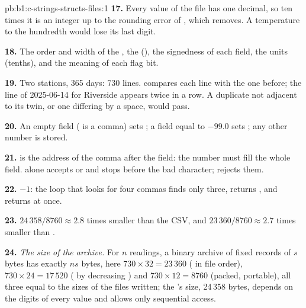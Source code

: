 \begin{solution}{pb:b1:c-strings-structs-files:1}
\textbf{17.} Every value of the file has one decimal, so ten times it is an integer up to the rounding error of
, which  removes. A temperature to the hundredth would lose its last digit.

\textbf{18.} The order and width of the , the  (), the signedness of each field, the
units (tenths), and the meaning of each flag bit.

\textbf{19.} Two stations, 365 days: 730 lines.  compares each line with the one before; the line
of 2025-06-14 for Riverside appears twice in a row. A duplicate not adjacent to its twin, or one differing by a space,
would pass.

\textbf{20.} An empty field ( is a comma) sets ; a field equal to $-99.0$ sets
; any other number is stored.

\textbf{21.}  is the address of the comma after the field: the number must fill the whole field.
 alone accepts  or  and stops before the bad character;  rejects
them.

\textbf{22.} $-1$: the loop that looks for four commas finds only three,  returns , and
 returns at once.

\textbf{23.} $24\,358 / 8760 \approx 2.8$ times smaller than the CSV, and $23\,360 / 8760 \approx 2.7$ times smaller
than .

\textbf{24.} \emph{The size of the archive.} For $n$ readings, a binary archive of fixed records of $s$ bytes has
exactly $ns$ bytes, here $730 \times 32 = 23\,360$ ( in file order), $730 \times 24 = 17\,520$ ( by
decreasing ) and $730 \times 12 = 8760$ (packed, portable), all three equal to the sizes of the files written;
the 's size, 24\,358 bytes, depends on the digits of every value and allows only sequential access.
\end{solution}
